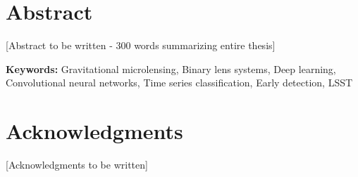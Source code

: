 






\maketitle
\thispagestyle{empty}

\frontmatter

\chapter*{Abstract}

[Abstract to be written - 300 words summarizing entire thesis]

\vspace{1cm}
\noindent\textbf{Keywords:} Gravitational microlensing, Binary lens systems, Deep learning, Convolutional neural networks, Time series classification, Early detection, LSST

\chapter*{Acknowledgments}

[Acknowledgments to be written]

\tableofcontents
\listoffigures
\listoftables

\mainmatter









\printbibliography[heading=bibintoc]

\begin{appendices}

\end{appendices}


